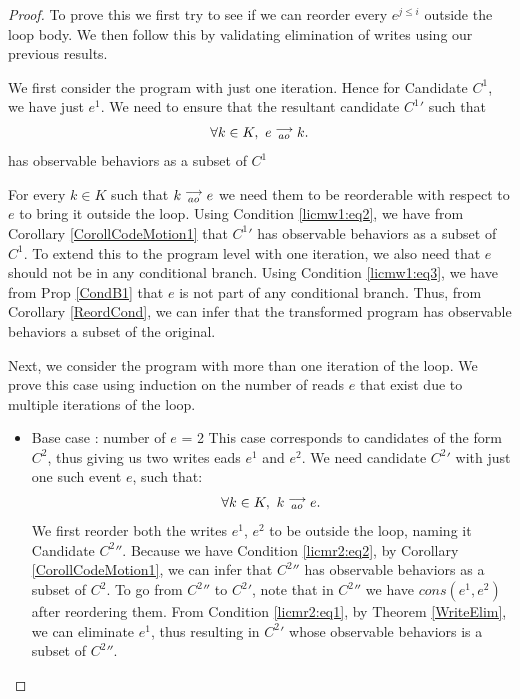 \begin{proof}

    To prove this we first try to see if we can reorder every $e^{j\leq i}$ outside the loop body.
    We then follow this by validating  elimination of writes using our previous results. 

    We first consider the program with just one iteration. Hence for Candidate $C^1$, we have just $e^1$. 
    We need to ensure that the resultant candidate $C^{1}'$ such that 
    \begin{align*}
        \forall k \in K, \ e\stackrel{\longrightarrow}{_{ao}}k.
    \end{align*}  
    has observable behaviors as a subset of $C^1$

    For every $k \in K$ such that $k\stackrel{\longrightarrow}{_{ao}}e$ we need them to be reorderable with respect to $e$ to bring it outside the loop.
    Using Condition \ref{licmw1:eq2}, we have from Corollary \ref{CorollCodeMotion1} that $C^{1}'$ has observable behaviors as a subset of $C^1$.
    To extend this to the program level with one iteration, we also need that $e$ should not be in any conditional branch.
    Using Condition \ref{licmw1:eq3}, we have from Prop \ref{CondB1} that $e$ is not part of any conditional branch.
    Thus, from Corollary \ref{ReordCond}, we can infer that the transformed program has observable behaviors a subset of the original.  
    
    Next, we consider the program with more than one iteration of the loop. 
    We prove this case using induction on the number of reads $e$ that exist due to multiple iterations of the loop. 
    \begin{itemize}

        \item Base case : number of $e$ = 2
        This case corresponds to candidates of the form $C^2$, thus giving us two writes eads $e^1$ and $e^2$.
        We need candidate $C^{2}'$ with just one such event $e$, such that:
        \begin{align*}
            \forall k \in K, \ k\stackrel{\longrightarrow}{_{ao}}e.
        \end{align*}  
        We first reorder both the writes $e^1$, $e^2$ to be outside the loop, naming it Candidate $C^{2}''$.
        Because we have Condition \ref{licmr2:eq2}, by Corollary \ref{CorollCodeMotion1}, we can infer that $C^{2}''$ has observable behaviors as a subset of $C^2$.
        To go from $C^{2}''$ to $C^{2}'$, note that in $C^{2}''$ we have $cons(e^1, e^2)$ after reordering them. 
        From Condition \ref{licmr2:eq1}, by Theorem \ref{WriteElim}, we can eliminate $e^1$, thus resulting in $C^{2}'$ whose observable behaviors is a subset of $C^{2}''$\footnotemark.


\end{itemize}
\end{proof}
